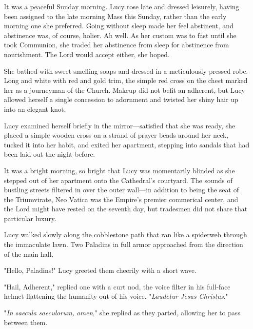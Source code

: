 It was a peaceful Sunday morning.  Lucy rose late and dressed leisurely, having
been assigned to the late morning Mass this Sunday, rather than the early
morning one she preferred.  Going without sleep made her feel abstinent, and
abstinence was, of course, holier.  Ah well.  As her custom was to fast until
she took Communion, she traded her abstinence from sleep for abstinence from
nourishment.  The Lord would accept either, she hoped.

She bathed with sweet-smelling soaps and dressed in a meticulously-pressed
robe.  Long and white with red and gold trim, the simple red cross on the chest
marked her as a journeyman of the Church.  Makeup did not befit an adherent,
but Lucy allowed herself a single concession to adornment and twisted her shiny
hair up into an elegant knot.

Lucy examined herself briefly in the mirror---satisfied that she was ready, she
placed a simple wooden cross on a strand of prayer beads around her neck,
tucked it into her habit, and exited her apartment, stepping into sandals that
had been laid out the night before.

It was a bright morning, so bright that Lucy was momentarily blinded as she
stepped out of her apartment onto the Cathedral's courtyard.  The sounds of
bustling streets filtered in over the outer wall---in addition to being the
seat of the Triumvirate, Neo Vatica was the Empire's premier commerical center,
and the Lord might have rested on the seventh day, but tradesmen did not share
that particular luxury.

Lucy walked slowly along the cobblestone path that ran like a spiderweb through
the immaculate lawn.  Two Paladins in full armor approached from the direction
of the main hall.

"Hello, Paladins!"  Lucy greeted them cheerily with a short wave.

"Hail, Adherent," replied one with a curt nod, the voice filter in his
full-face helmet flattening the humanity out of his voice. "\textit{Laudetur
Jesus Christus}."

"\textit{In saecula saeculorum, amen}," she replied as they parted, allowing
her to pass between them.

